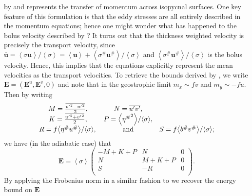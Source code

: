 \documentclass[12pt,a4paper]{report}
\newcommand*\thkmean[1]{\overline{#1}}
\newcommand*\thkres[1]{{#1}^{\prime}}
\newcommand*\nthkmean[1]{\left\langle{#1}\right\rangle}
\newcommand*\nthkres[1]{{#1}^{\#}}
\begin{document}
                   by \cite{rhines1979theoretical} and represents the transfer of momentum
                   across isopycnal surfaces. One key feature of this formulation
                   is that the eddy stresses are all entirely described in the momentum
                   equations; hence one might wonder what has happened to 
                   the bolus velocity described by \cite{gent1995parameterizing}? 
                   It turns out that the thickness weighted velocity is precisely 
                   the transport velocity, since $\thkmean{\boldsymbol{u}}=\nthkmean{\sigma\boldsymbol{u}}/\nthkmean{\sigma}=\nthkmean{\boldsymbol{u}} + \nthkmean{\nthkres{\sigma}\nthkres{\boldsymbol{u}}}/\nthkmean{\sigma}$
                   and  $\nthkmean{\nthkres{\sigma}\nthkres{\boldsymbol{u}}}/\nthkmean{\sigma}$
                   is the bolus velocity. Hence, this implies that  the equations explicitly
                    represent the mean velocities as the  transport velocities.
                     To retrieve the bounds derived by \cite{marshall2012framework},
                     we write $\boldsymbol{E} = (\boldsymbol{E}^{u}, \boldsymbol{E}^{v}, 0)$
                     and note that in the geostrophic limit $m_x \sim fv$ and  $m_y \sim -fu$.
                     Then by writing 
                     \begin{equation}
                     \begin{array}{ccc}
                     M = \frac{\thkmean{{\thkres{v}}^{2} - {\thkres{u}}^{2}}}{2}, & 
                     N = \thkmean{\thkres{u}\thkres{v} }, \\
                     K = \frac{\thkmean{{\thkres{u}}^{2} + {\thkres{v}}^{2}}}{2}, & 
                     P =  {\nthkmean{{\nthkres{\eta}}^{2}}}/{\nthkmean{\sigma}},  \\ 
                     R =  f{\nthkmean{\nthkres{\eta}\nthkres{u}}}/{\nthkmean{\sigma}}, \, & \rm and  &  
                     S = f{\nthkmean{\nthkres{b}\nthkres{v}}}/{\nthkmean{\sigma}} ;
                     \end{array} 
                     \end{equation}
                     we have (in the adiabatic case) that
                     \begin{equation}
                     \boldsymbol{E}=\nthkmean{\sigma}\left(
                     \begin{array}{ccc}
                     -M+K+P & N & 0 \\
                     N & M+K+P & 0 \\
                     S & -R & 0 \\
                     \end{array}\right).
                     \end{equation}
                     By applying the Frobenius norm in a similar fashion to 
                     \cite{marshall2012framework} we recover the energy bound on
                      $\boldsymbol{E}$
                      
\end{document}
